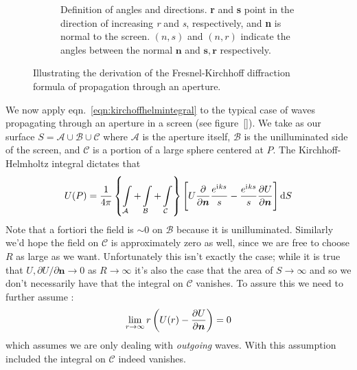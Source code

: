 \begin{figure}
\begin{subfigure}[b]{\subfigwidth}
        \caption{Definition of angles and directions. \textbf{r} and \textbf{s} point in the direction of increasing \textit{r}
        and \textit{s}, respectively, and \textbf{n} is normal to the screen. \((n,s)\) and \((n,r)\) indicate the angles between the normal \(\bm{n}\) and \(\bm{s}, \bm{r}\) respectively.}\label{subfig:fresnelkirchoffangles}
    \end{subfigure}
    \caption{Illustrating the derivation of the Fresnel-Kirchhoff diffraction formula of propagation through an aperture.}\label{fig:fresnelkirchoff}
\end{figure}

We now apply eqn.~\eqref{eqn:kirchoffhelmintegral} to the typical case of waves propagating through an aperture in a screen (see figure~\ref{}).
%
We take as our surface \(S = \mathcal{A} \cup \mathcal{B} \cup \mathcal{C}\) where \(\mathcal{A}\) is the aperture itself, \(\mathcal{B}\) is the unilluminated side of the screen, and \(\mathcal{C}\) is a portion of a large sphere centered at \(P\).
%
The Kirchhoff-Helmholtz integral dictates that 
%
\begin{equation}
    U(P) = \frac{1}{4 \pi} \left\{ \int\limits_{\mathcal{A}}  + \int\limits_{\mathcal{B}} + \int\limits_{\mathcal{C}}  \right\} \left[ U \pdv{}{\bm{n}} \frac{e^{\iu k s}}{s} - \frac{e^{\iu k s}}{s} \pdv{U}{\bm{n}} \right] \dif S
\end{equation}
%
Note that a fortiori the field is \(\sim 0\) on \(\mathcal{B}\) because it is unilluminated.
%
Similarly we'd hope the field on \(\mathcal{C}\) is approximately zero as well, since we are free to choose \(R\) as large as we want.
%
Unfortunately this isn't exactly the case; while it is true that \(U, \partial U/ \partial \bm{n} \rightarrow 0\) as \(R \rightarrow \infty\) it's also the case that the area of \(S \rightarrow \infty\) and so we don't necessarily have that the integral on \(\mathcal{C}\) vanishes.
%
To assure this we need to further assume :
%
\begin{equation}
    \lim_{r \rightarrow \infty} r \left( U(r) - \pdv{U}{\bm{n}} \right)  = 0
\end{equation}
%
which assumes we are only dealing with \textit{outgoing} waves.
%
With this assumption included the integral on \(\mathcal{C}\) indeed vanishes.

